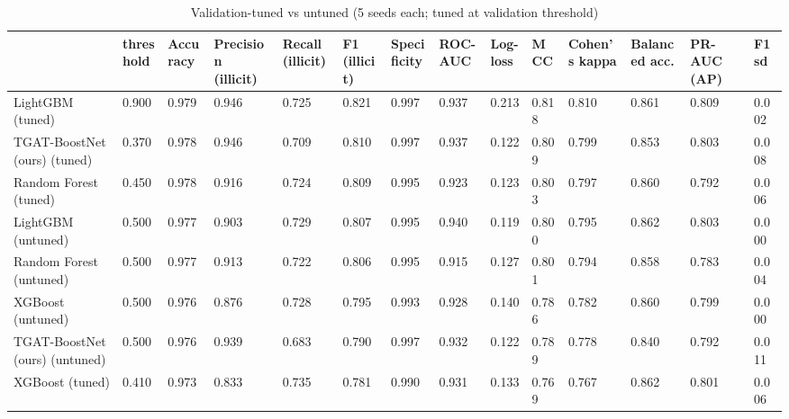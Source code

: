 \begin{table}
\caption{Validation-tuned vs untuned (5 seeds each; tuned at validation threshold)}
\label{tab:03_tuned_vs_untuned}
\begin{tabular}{llllllllllllll}
\toprule
 & threshold & Accuracy & Precision (illicit) & Recall (illicit) & F1 (illicit) & Specificity & ROC-AUC & Log-loss & MCC & Cohen's kappa & Balanced acc. & PR-AUC (AP) & F1 sd \\
\midrule
LightGBM (tuned) & 0.900 & 0.979 & 0.946 & 0.725 & 0.821 & 0.997 & 0.937 & 0.213 & 0.818 & 0.810 & 0.861 & 0.809 & 0.002 \\
TGAT-BoostNet (ours) (tuned) & 0.370 & 0.978 & 0.946 & 0.709 & 0.810 & 0.997 & 0.937 & 0.122 & 0.809 & 0.799 & 0.853 & 0.803 & 0.008 \\
Random Forest (tuned) & 0.450 & 0.978 & 0.916 & 0.724 & 0.809 & 0.995 & 0.923 & 0.123 & 0.803 & 0.797 & 0.860 & 0.792 & 0.006 \\
LightGBM (untuned) & 0.500 & 0.977 & 0.903 & 0.729 & 0.807 & 0.995 & 0.940 & 0.119 & 0.800 & 0.795 & 0.862 & 0.803 & 0.000 \\
Random Forest (untuned) & 0.500 & 0.977 & 0.913 & 0.722 & 0.806 & 0.995 & 0.915 & 0.127 & 0.801 & 0.794 & 0.858 & 0.783 & 0.004 \\
XGBoost (untuned) & 0.500 & 0.976 & 0.876 & 0.728 & 0.795 & 0.993 & 0.928 & 0.140 & 0.786 & 0.782 & 0.860 & 0.799 & 0.000 \\
TGAT-BoostNet (ours) (untuned) & 0.500 & 0.976 & 0.939 & 0.683 & 0.790 & 0.997 & 0.932 & 0.122 & 0.789 & 0.778 & 0.840 & 0.792 & 0.011 \\
XGBoost (tuned) & 0.410 & 0.973 & 0.833 & 0.735 & 0.781 & 0.990 & 0.931 & 0.133 & 0.769 & 0.767 & 0.862 & 0.801 & 0.006 \\
\bottomrule
\end{tabular}
\end{table}
